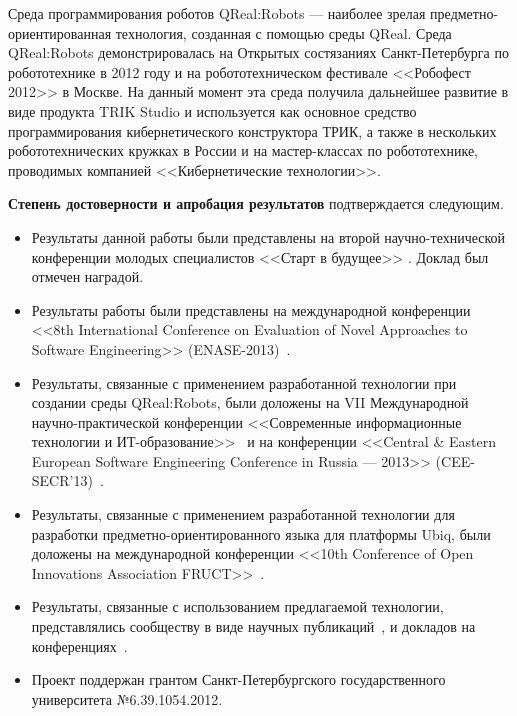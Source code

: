 Среда программирования роботов QReal:Robots --- наиболее зрелая 
предметно-ориентированная технология, созданная с помощью среды QReal. Среда QReal:Robots 
демонстрировалась на Открытых состязаниях Санкт-Петербурга по робототехнике 
в 2012 году и на робототехническом фестивале <<Робофест 2012>> в Москве. На данный 
момент эта среда получила дальнейшее развитие в виде продукта TRIK Studio и используется 
как основное средство программирования кибернетического конструктора ТРИК, а также в 
нескольких робототехнических кружках в России и на мастер-классах по робототехнике, проводимых 
компанией <<Кибернетические технологии>>.

\textbf{Степень достоверности и апробация результатов} подтверждается следующим.
\begin{itemize}
	\item Результаты данной работы были представлены на второй 
		научно-технической конференции молодых специалистов <<Старт в будущее>> 
		\cite{kuzenkova2011metamodeling2}. Доклад был отмечен наградой.
	\item Результаты работы были представлены на международной конференции 
		<<8th International Conference on Evaluation of Novel Approaches to Software Engineering>> 
		(ENASE-2013)~.
	\item Результаты, связанные с применением разработанной технологии при 
		создании среды QReal:Robots, были доложены на VII Международной 
		научно-практической конференции <<Современные информационные технологии 
		и ИТ-образование>>~\cite{litvinov2012robots} и на конференции <<Central \& Eastern European
		Software Engineering Conference in Russia --- 2013>> (CEE-SECR'13)~\cite{terekhov2013secr}.
	\item Результаты, связанные с применением разработанной технологии для 
		разработки предметно-ориентированного языка для платформы Ubiq, были доложены 
		на международной конференции <<10th Conference of Open Innovations 
		Association FRUCT>>~\cite{bryksin2011ubiq}.
	\item Результаты, связанные с использованием предлагаемой технологии,
		представлялись сообществу в виде научных публикаций~, \cite{osechkina2010gestures, terekhov2009architecture}
		и докладов на конференциях~\cite{terekhov2013robots, kuzenkova2013refactoring,
		osechkina2012multistroke, bryksin2011qreal, kuzenkova2011metamodeling, bryksin2011robots}.
	\item Проект поддержан грантом Санкт-Петербургского государственного университета №6.39.1054.2012.
\end{itemize}


